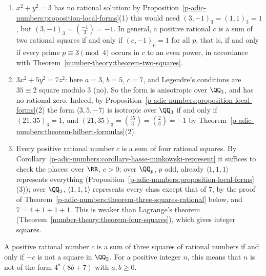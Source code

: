 \begin{example}\label{p-adic-numbers:example-hasse-minkowski}
\begin{enumerate}
\item $x^2 + y^2 = 3$ has no rational solution: by Proposition~\ref{p-adic-numbers:proposition-local-forms}(1) this would need $(3, -1)_3 = (1, 1)_3 = 1$, but $(3, -1)_3 = (\frac{-1}{3}) = -1$. In general, a positive
rational $c$ is a sum of two rational squares if and only if $(c, -1)_p = 1$ for all $p$, that is, if and only if every prime $p \equiv 3 \pmod 4$ occurs in $c$ to an even power, in accordance with
Theorem~\ref{number-theory:theorem-two-squares}.
\item $3x^2 + 5y^2 = 7z^2$: here $a = 3$, $b = 5$, $c = 7$, and Legendre's conditions are $35 \equiv 2$ square modulo $3$ (no). So the form is anisotropic over $\QQ_3$, and has no rational zero. Indeed, by
Proposition~\ref{p-adic-numbers:proposition-local-forms}(2) the form $\langle 3, 5, -7\rangle$ is isotropic over $\QQ_3$ if and only if $(21, 35)_3 = 1$, and
$(21, 35)_3 = (\frac{35}{3}) = (\frac{2}{3}) = -1$ by Theorem~\ref{p-adic-numbers:theorem-hilbert-formulas}(2).
\item Every positive rational number $c$ is a sum of four rational squares. By Corollary~\ref{p-adic-numbers:corollary-hasse-minkowski-represent} it suffices to check the places: over $\RR$, $c > 0$; over $\QQ_p$, $p$ odd,
already $\langle 1, 1, 1\rangle$ represents everything (Proposition~\ref{p-adic-numbers:proposition-local-forms}(3)); over $\QQ_2$, $\langle 1, 1, 1\rangle$ represents every class except that of $7$, by the proof of
Theorem~\ref{p-adic-numbers:theorem-three-squares-rational} below, and $7 = 4 + 1 + 1 + 1$. This is weaker than Lagrange's theorem (Theorem~\ref{number-theory:theorem-four-squares}), which gives integer squares.
\end{enumerate}
\end{example}

\begin{theorem}\label{p-adic-numbers:theorem-three-squares-rational}
A positive rational number $c$ is a sum of three squares of rational numbers if and only if $-c$ is not a square in $\QQ_2$. For a positive integer $n$, this means that $n$ is not of the form
$4^a(8b + 7)$ with $a, b \geq 0$.
\end{theorem}

